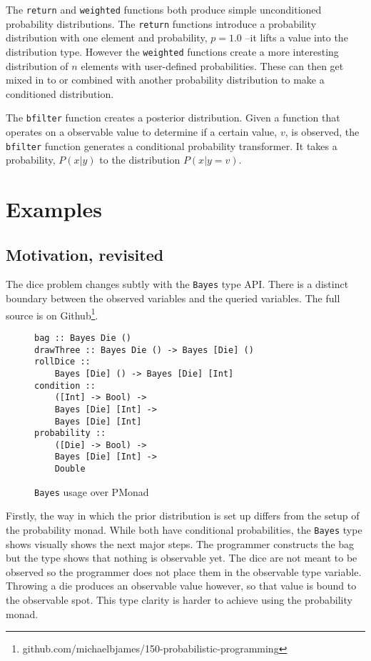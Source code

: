 \documentclass[10pt,twocolumn]{article}
\begin{document}
The \texttt{return} and \texttt{weighted} functions both produce simple unconditioned probability distributions. The \texttt{return} functions introduce a probability distribution with one element and probability, $p=1.0$ --it lifts a value into the distribution type. However the \texttt{weighted} functions create a more interesting distribution of $n$ elements with user-defined probabilities. These can then get mixed in to or combined with another probability distribution to make a conditioned distribution.

The \texttt{bfilter} function creates a posterior distribution. Given a function that operates on a observable value to determine if a certain value, $v$, is observed, the \texttt{bfilter} function generates a conditional probability transformer. It takes a probability, $P(x | y)$ to the distribution $P(x | y = v)$.

\section{Examples}
\subsection{Motivation, revisited}
The dice problem changes subtly with the \texttt{Bayes} type API. There is a distinct boundary between the observed variables and the queried variables. The full source is on Github\footnote{github.com/michaelbjames/150-probabilistic-programming}.
\begin{figure}[H]
\begin{verbatim}
bag :: Bayes Die ()
drawThree :: Bayes Die () -> Bayes [Die] ()
rollDice ::
    Bayes [Die] () -> Bayes [Die] [Int]
condition ::
    ([Int] -> Bool) ->
    Bayes [Die] [Int] ->
    Bayes [Die] [Int]
probability ::
    ([Die] -> Bool) ->
    Bayes [Die] [Int] ->
    Double
\end{verbatim}
\caption{\texttt{Bayes} usage over PMonad}
\end{figure}
Firstly, the way in which the prior distribution is set up differs from the setup of the probability monad. While both have conditional probabilities, the \texttt{Bayes} type shows visually shows the next major steps. The programmer constructs the bag but the type shows that nothing is observable yet. The dice are not meant to be observed so the programmer does not place them in the observable type variable. Throwing a die produces an observable value however, so that value is bound to the observable spot. This type clarity is harder to achieve using the probability monad.
\end{document}
